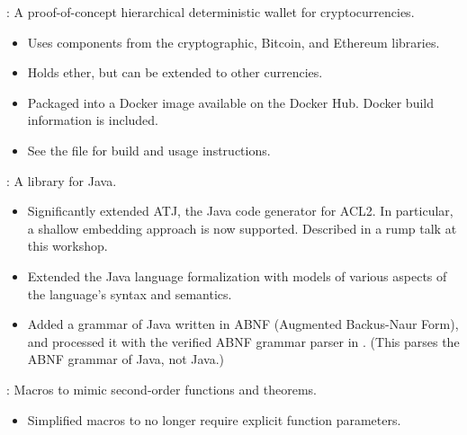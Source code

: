 \begin{frame}

\implibtitle

:
A proof-of-concept hierarchical deterministic wallet for cryptocurrencies.
\begin{itemize}
\item
Uses components from the cryptographic, Bitcoin, and Ethereum libraries.
\item
Holds ether, but can be extended to other currencies.
\item
Packaged into a Docker image available on the Docker Hub.
Docker build information is included.
\item
See the file 
for build and usage instructions.
\end{itemize}

\end{frame}


\begin{frame}

\implibtitle

:
A library for Java.
\begin{itemize}
\item
Significantly extended ATJ, the Java code generator for ACL2.
In particular, a shallow embedding approach is now supported.
Described in a rump talk at this workshop.
\item
Extended the Java language formalization with models of
various aspects of the language's syntax and semantics.
\item
Added a grammar of Java written in ABNF (Augmented Backus-Naur Form),
and processed it with the verified ABNF grammar parser in .
(This parses the ABNF grammar of Java, not Java.)
\end{itemize}

\end{frame}


\begin{frame}

\implibtitle

:
Macros to mimic second-order functions and theorems.
\begin{itemize}
\item
Simplified macros to no longer require explicit function parameters.
\end{itemize}

\end{frame}

